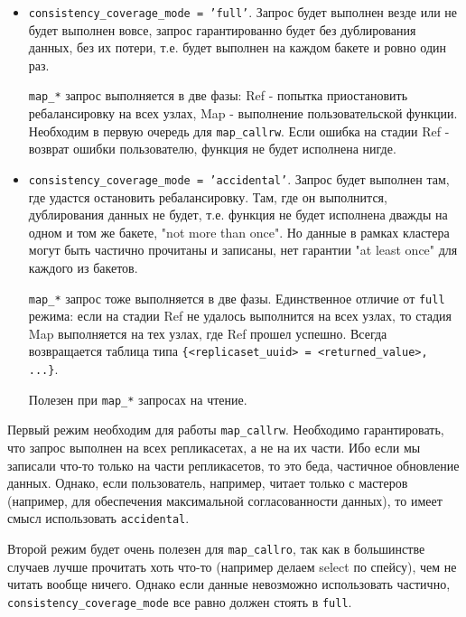 \begin{itemize}
    \item \texttt{consistency\_coverage\_mode = 'full'}. Запрос будет выполнен
        везде или не будет выполнен вовсе, запрос гарантированно будет без
        дублирования данных, без их потери, т.е. будет выполнен на каждом
        бакете и ровно один раз.

    \texttt{map\_*} запрос выполняется в две фазы: Ref - попытка приостановить
        ребалансировку на всех узлах, Map - выполнение пользовательской
        функции. Необходим в первую очередь для \texttt{map\_callrw}. Если
        ошибка на стадии Ref - возврат ошибки пользователю, функция не будет
        исполнена нигде.

    \item \texttt{consistency\_coverage\_mode = 'accidental'}. Запрос будет
        выполнен там, где удастся остановить ребалансировку. Там, где он
        выполнится, дублирования данных не будет, т.е. функция не будет
        исполнена дважды на одном и том же бакете, "not more than once". Но
        данные в рамках кластера могут быть частично прочитаны и записаны, нет
        гарантии "at least once" для каждого из бакетов.

    \texttt{map\_*} запрос тоже выполняется в две фазы. Единственное отличие от
        \texttt{full} режима: если на стадии Ref не удалось выполнится на всех
        узлах, то стадия Map выполняется на тех узлах, где Ref прошел
        успешно. Всегда возвращается таблица типа \texttt{\{<replicaset\_uuid>
        = <returned\_value>, ...\}}.

    Полезен при \texttt{map\_*} запросах на чтение.
\end{itemize}

Первый режим необходим для работы \texttt{map\_callrw}. Необходимо
гарантировать, что запрос выполнен на всех репликасетах, а не на их части. Ибо
если мы записали что-то только на части репликасетов, то это беда, частичное
обновление данных. Однако, если пользователь, например, читает только с
мастеров (например, для обеспечения максимальной согласованности данных), то
имеет смысл использовать \texttt{accidental}.

Второй режим будет очень полезен для \texttt{map\_callro}, так как в
большинстве случаев лучше прочитать хоть что-то (например делаем select по
спейсу), чем не читать вообще ничего. Однако если данные невозможно
использовать частично, \texttt{consistency\_coverage\_mode} все равно должен
стоять в \texttt{full}.

